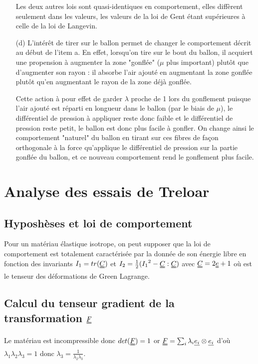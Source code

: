 \documentclass[a4paper,11pt]{article}
\begin{document}
\begin{enumerate}
\hspace{0.8cm}Les deux autres lois sont quasi-identiques en comportement, elles diffèrent seulement dans les valeurs, les valeurs de la loi de Gent étant supérieures à celle de la loi de Langevin.

\item[(d)]
L'intérêt de tirer sur le ballon permet de changer le comportement décrit au début de l'item a. En effet, lorsqu'on tire sur le bout du ballon, il acquiert une propension à augmenter la zone "gonflée" ($\mu$ plus important) plutôt que d'augmenter son rayon : il absorbe l'air ajouté en augmentant la zone gonflée plutôt qu'en augmentant le rayon de la zone déjà gonflée.

\hspace{0.8cm}Cette action à pour effet de garder $\lambda$ proche de 1 lors du gonflement puisque l'air ajouté est réparti en longueur dans le ballon (par le biais de $\mu$), le différentiel de pression à appliquer reste donc faible et le différentiel de pression reste petit, le ballon est donc plus facile à gonfler. On change ainsi le comportement "naturel" du ballon en tirant sur ces fibres de façon orthogonale à la force qu'applique le différentiel de pression sur la partie gonflée du ballon, et ce nouveau comportement rend le gonflement plus facile.
\end{enumerate}

\section{Analyse des essais de Treloar}
\subsection{Hyposhèses et loi de comportement}
Pour un matériau élastique isotrope, on peut supposer que la loi de comportement est totalement caractérisée par la donnée de son énergie libre en fonction des invariants $I_1= tr(\uuline{C})$ et $I_2=\frac{1}{2}({I_1}^2-\uuline{C}:\uuline{C})$ avec $\uuline{C} = 2\uuline{e}+1$ où  est le tenseur des déformations de Green Lagrange.

\subsection*{Calcul du tenseur gradient de la transformation $\uuline{F}$}
Le matériau est incompressible donc $det(\uuline{F})=1$ or $\uuline{F}=\sum_{i} \lambda_i \uline{e_i}\otimes \uline{e_i}$ d'où $\lambda_1\lambda_2\lambda_3=1$ donc $\lambda_3=\frac{1}{\lambda_2\lambda_3} $.
\end{document}
